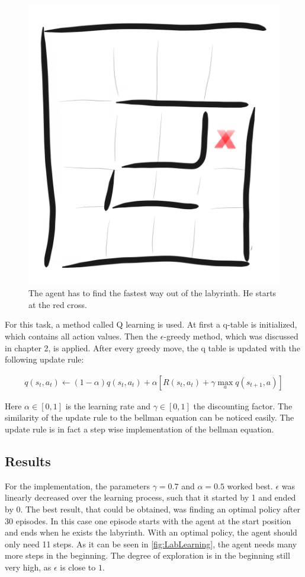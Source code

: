 \documentclass[paper=a4, fontsize=11pt]{scrartcl} %
\numberwithin{equation}{section} %
\numberwithin{figure}{section} %
\numberwithin{table}{section} %
\begin{document}
\begin{figure}[H]
\centering
\includegraphics[width=0.2\linewidth]{Images/sketch.png}
\caption{The agent has to find the fastest way out of the labyrinth. He starts at the red cross.}
\label{fig:labyrinth}
\end{figure}

	For this task, a method called Q learning is used. At first a q-table is initialized, which contains all action values. Then the $\epsilon$-greedy method, which was discussed in chapter 2, is applied. After every greedy move, the q table is updated with the following update rule: 
	
\begin {align}
q(s_t,a_t) \leftarrow (1 - \alpha) q(s_t,a_t) + \alpha[R(s_t,a_t) + \gamma \max\limits_a q(s_{t+1},a)]
\end{align}

	Here $\alpha \in [0,1]$ is the learning rate and $\gamma \in [0,1]$ the discounting factor. The similarity of the update rule to the bellman equation can be noticed easily. The update rule is in fact a step wise implementation of the bellman equation.

\subsection{Results}

	For the implementation, the parameters $\gamma = 0.7$ and $\alpha = 0.5$ worked best. $\epsilon$ was linearly decreased over the learning process, such that it started by 1 and ended by 0. The best result, that could be obtained, was finding an optimal policy after 30 episodes. In this case one episode starts with the agent at the start position and ends when he exists the labyrinth. With an optimal policy, the agent should only need 11 steps. As it can be seen in \ref{fig:LabLearning}, the agent needs many more steps in the beginning. The degree of exploration is in the beginning still very high, as $\epsilon$ is close to $1$. 
\end{document}
